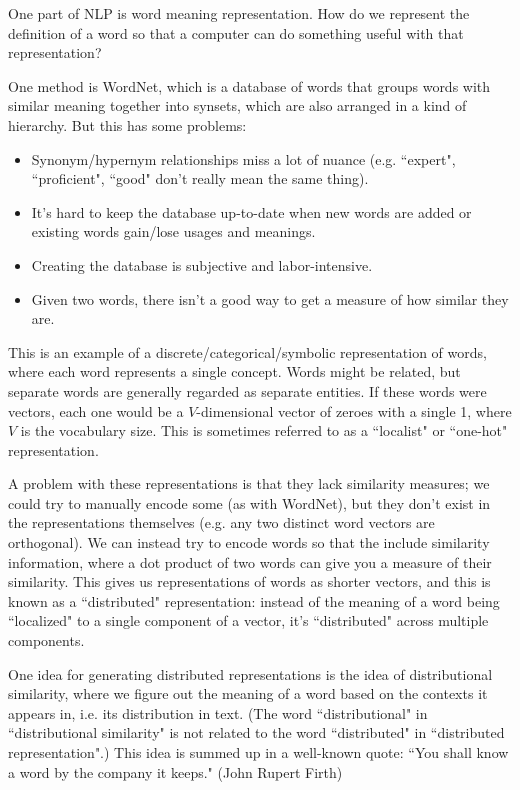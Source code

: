 One part of NLP is word meaning representation. How do we represent the definition of a word so that a computer can do something useful with that representation?

One method is WordNet, which is a database of words that groups words with similar meaning together into synsets, which are also arranged in a kind of hierarchy. But this has some problems:
\begin{itemize}
\item Synonym/hypernym relationships miss a lot of nuance (e.g. ``expert", ``proficient", ``good" don't really mean the same thing).
\item It's hard to keep the database up-to-date when new words are added or existing words gain/lose usages and meanings.
\item Creating the database is subjective and labor-intensive.
\item Given two words, there isn't a good way to get a measure of how similar they are.
\end{itemize}
This is an example of a discrete/categorical/symbolic representation of words, where each word represents a single concept. Words might be related, but separate words are generally regarded as separate entities. If these words were vectors, each one would be a $V$-dimensional vector of zeroes with a single 1, where $V$ is the vocabulary size. This is sometimes referred to as a ``localist" or ``one-hot" representation.

A problem with these representations is that they lack similarity measures; we could try to manually encode some (as with WordNet), but they don't exist in the representations themselves (e.g. any two distinct word vectors are orthogonal). We can instead try to encode words so that the include similarity information, where a dot product of two words can give you a measure of their similarity. This gives us representations of words as shorter vectors, and this is known as a ``distributed" representation: instead of the meaning of a word being ``localized" to a single component of a vector, it's ``distributed" across multiple components.

One idea for generating distributed representations is the idea of distributional similarity, where we figure out the meaning of a word based on the contexts it appears in, i.e. its distribution in text. (The word ``distributional" in ``distributional similarity" is not related to the word ``distributed" in ``distributed representation".) This idea is summed up in a well-known quote: ``You shall know a word by the company it keeps." (John Rupert Firth)

